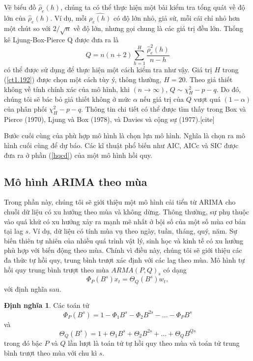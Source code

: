 \documentclass[12pt, a4paper,oneside]{book}
\theoremstyle{definition}
\newtheorem{dn}[theo]{Định nghĩa}
\begin{document}
Vẽ biểu đồ $\hat{\rho}_{e}(h)$, chúng ta có thể thực hiện một bài kiểm tra tổng quát về độ lớn của $\hat{\rho}_{e}(h)$. Ví dụ, mỗi $\hat{\rho_{e}(h)}$ có độ lớn nhỏ, giả sử, mỗi cái chỉ nhỏ hơn một chút so với $2/\sqrt{n}$ về độ lớn, nhưng gọi chung là các giá trị đều lớn. Thống kê Ljung-Box-Pierce Q được đưa ra là 
\begin{equation}
Q= n(n+2)\displaystyle\sum_{h=1}^{H}\dfrac{\hat{\rho}_{e}^{2}(h)}{n-h} \label{ct1.192}
\end{equation}
có thể được sử dụng để thực hiện một cách kiểm tra như vậy. Giá trị $H$ trong (\ref{ct1.192}) được chọn một cách tùy ý, thông thường, $H = 20$. Theo giả thiết không về tính chính xác của mô hình, khi $(n\rightarrow \infty)$, $Q\sim \chi^{2}_H-p-q$. Do đó, chúng tôi sẽ bác bỏ giả thiết không ở mức $\alpha$ nếu giá trị của $Q$ vượt quá $(1-\alpha)$ của phân phối $\chi^{2}_H-p-q$. Thông tin chi tiết có thể được tìm thấy trong Box và Pierce (1970), Ljung và Box (1978), và Davies và cộng sự (1977).[cite]

Bước cuối cùng của phù hợp mô hình là chọn lựa mô hình. Nghĩa là chọn ra mô hình cuối cùng để dự báo. Các kĩ thuật phổ biến như AIC, AICc và SIC được đưa ra ở phần (\ref{hqcd}) của một mô hình hồi quy.
\subsection{Mô hình ARIMA theo mùa}
Trong phần này, chúng tôi sẽ giới thiệu một mô hình cải tiển từ ARIMA cho chuỗi dữ liệu có xu hướng theo mùa và không dừng. Thông thường, sự phụ thuộc vào quá khứ có xu hướng xảy ra mạnh mẽ nhất ở bội số của một số mùa cơ bản tại lag $s$. Ví dụ, dữ liệu có tính mùa vụ theo ngày, tuần, tháng, quý, năm. Sự biến thiên tự nhiên của nhiều quá trình vật lý, sinh học và kinh tế có xu hướng phù hợp với biến động theo mùa. Chính vì điều này, chúng tôi sẽ giới thiệu các đa thức tự hồi quy, trung bình trượt xác định với các lag theo mùa. Mô hình tự hồi quy trung bình trượt theo mùa $ARMA(P,Q)_s$  có dạng 
\begin{equation}
\Phi_{P}(B^{s})x_{t}=\varTheta_{Q}(B^{s})w_{t}, \label{ct1.193}
\end{equation}
với định nghĩa sau.
\begin{dn}Các toán tử
\begin{equation}
\Phi_ {P} (B^{s}) = 1-\Phi_{1}  B^{s} -\Phi_{2}  B^{2s}-...- \Phi_{P}  B^{s} \label{ct1.194}
\end{equation}	
và
\begin{equation}
\varTheta_{Q}(B^{s})= 1+ \varTheta_{1}B^{s} + \varTheta_{2}B^{2s}+...+ \varTheta_{Q}B^{Qs} \label{ct1.195}	
\end{equation}
trong đó bậc $P$ và $Q$ lần lượt là toán tử tự hồi quy theo mùa và toán tử trung bình trượt theo mùa với chu kì $s$.
\end{dn}
\end{document}
